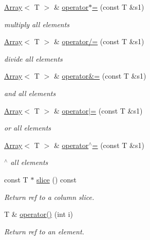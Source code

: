 \begin{DoxyCompactItemize}
\mbox{\hyperlink{classXMLArray_1_1Array}{Array}}$<$ T $>$ \& \mbox{\hyperlink{classXMLArray_1_1Array_a4afa4c469f84b40f88c27273602528cc}{operator$\ast$=}} (const T \&s1)
\begin{DoxyCompactList}\small\item\em multiply all elements \end{DoxyCompactList}\item 
\mbox{\hyperlink{classXMLArray_1_1Array}{Array}}$<$ T $>$ \& \mbox{\hyperlink{classXMLArray_1_1Array_add7ef0354bf795511a654f1241da3318}{operator/=}} (const T \&s1)
\begin{DoxyCompactList}\small\item\em divide all elements \end{DoxyCompactList}\item 
\mbox{\hyperlink{classXMLArray_1_1Array}{Array}}$<$ T $>$ \& \mbox{\hyperlink{classXMLArray_1_1Array_a7f264e277398588e0e37763573f48fc7}{operator\&=}} (const T \&s1)
\begin{DoxyCompactList}\small\item\em and all elements \end{DoxyCompactList}\item 
\mbox{\hyperlink{classXMLArray_1_1Array}{Array}}$<$ T $>$ \& \mbox{\hyperlink{classXMLArray_1_1Array_a719213ff71df03fd3e561d1d4f9656cc}{operator$\vert$=}} (const T \&s1)
\begin{DoxyCompactList}\small\item\em or all elements \end{DoxyCompactList}\item 
\mbox{\hyperlink{classXMLArray_1_1Array}{Array}}$<$ T $>$ \& \mbox{\hyperlink{classXMLArray_1_1Array_ac68e4b59911e762c271c90a6aa81e0c3}{operator$^\wedge$=}} (const T \&s1)
\begin{DoxyCompactList}\small\item\em $^\wedge$ all elements \end{DoxyCompactList}\item 
const T $\ast$ \mbox{\hyperlink{classXMLArray_1_1Array_a9c9e3fdc44557d1241103c207f7f69af}{slice}} () const
\begin{DoxyCompactList}\small\item\em Return ref to a column slice. \end{DoxyCompactList}\item 
T \& \mbox{\hyperlink{classXMLArray_1_1Array_aaa5b7fcaa413265173fc75d3a5bbf837}{operator()}} (int i)
\begin{DoxyCompactList}\small\item\em Return ref to an element. \end{DoxyCompactList}\item 

\end{DoxyCompactItemize}

